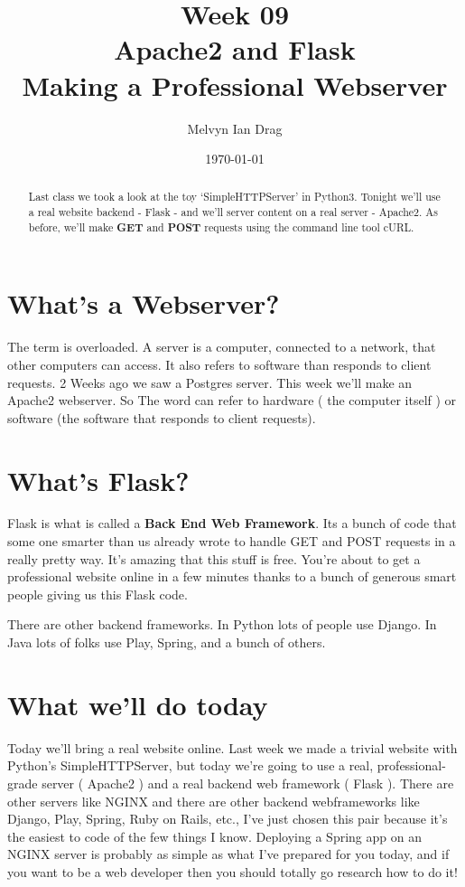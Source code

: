 \documentclass[10pt]{article}
\title{\textbf{Week 09} \\
\LARGE Apache2 and Flask \\
\Large Making a Professional Webserver}
\author{
	Melvyn Ian Drag
}
\date{\today}
\begin{document}
\maketitle

\begin{abstract}
Last class we took a look at the toy `SimpleHTTPServer' in Python3. Tonight we'll use a real website backend - Flask - and we'll server content on a real server - Apache2. As before, we'll make \textbf{GET} and \textbf{POST} requests using the command line tool cURL.
\end{abstract}


\section{What's a Webserver?}
The term is overloaded. A server is a computer, connected to a network, that
other computers can access. It also refers to software than responds to client
requests. 2 Weeks ago we saw a Postgres server. This week we'll make an Apache2
webserver. So The word can refer to hardware ( the computer itself ) or software
(the software that responds to client requests).

\section{What's Flask?}
Flask is what is called a \textbf{Back End Web Framework}. Its a bunch of code
that some one smarter than us already wrote to handle GET and POST requests in a
really pretty way. It's amazing that this stuff is free. You're about to get a
professional website online in a few minutes thanks to a bunch of generous smart
people giving us this Flask code.

There are other backend frameworks. In Python lots of people use Django. In Java
lots of folks use Play, Spring, and a bunch of others.

\section{What we'll do today}
Today we'll bring a real website online. Last week we made a trivial website
with Python's SimpleHTTPServer, but today we're going to use a real,
professional-grade server ( Apache2 ) and a real backend web framework ( Flask
). There are other servers like NGINX and there are other backend webframeworks
like Django, Play, Spring, Ruby on Rails, etc., I've just chosen this pair
because it's the easiest to code of the few things I know. Deploying a Spring
app on an NGINX server is probably as simple as what I've prepared for you
today, and if you want to be a web developer then you should totally go research
how to do it!
\end{document}
